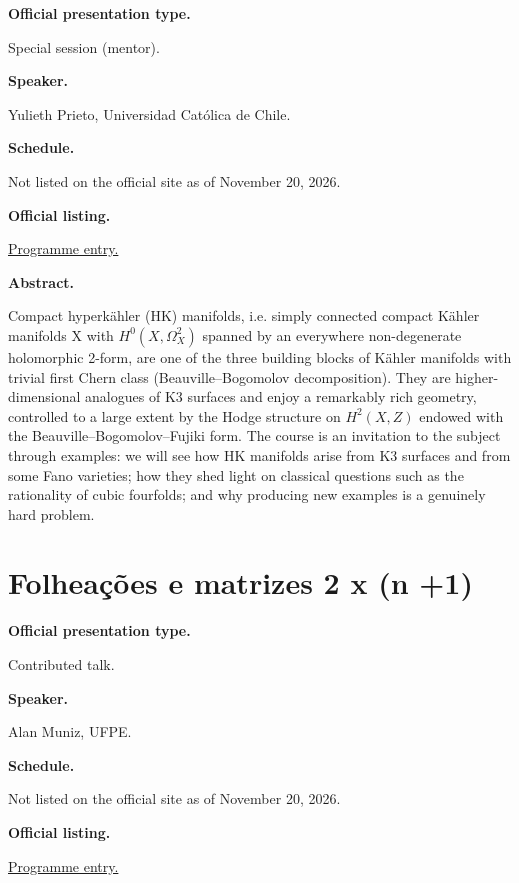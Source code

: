 \medskip\noindent
{\bf Official presentation type.}

Special session (mentor).

\medskip\noindent
{\bf Speaker.}

Yulieth Prieto, Universidad Católica de
Chile.

\medskip\noindent
{\bf Schedule.}

Not listed on the official site as of
November 20, 2026.

\medskip\noindent
{\bf Official listing.}

\href{%
https://sites.google.com/view/%
geoalgcompluff/legal/%
legal-2027-resumos#h.6f5k7zdb7c47%
}{Programme entry.}

\medskip\noindent
{\bf Abstract.}

Compact hyperkähler (HK) manifolds, i.e.
simply connected compact Kähler manifolds X
with $H^0(X,\Omega^2_X)$ spanned by an
everywhere non-degenerate holomorphic 2-form,
are one of the three building blocks of
Kähler manifolds with trivial first Chern
class (Beauville--Bogomolov decomposition).
They are higher-dimensional analogues of K3
surfaces and enjoy a remarkably rich
geometry, controlled to a large extent by the
Hodge structure on $H^2(X,Z)$ endowed with
the Beauville--Bogomolov--Fujiki form. The
course is an invitation to the subject
through examples: we will see how HK
manifolds arise from K3 surfaces and from
some Fano varieties; how they shed light on
classical questions such as the rationality
of cubic fourfolds; and why producing new
examples is a genuinely hard problem.

\section{Folheações e matrizes 2 x (n +1)}
\label{section-folheacoes-e-matrizes-2-x-n-1}

\medskip\noindent
{\bf Official presentation type.}

Contributed talk.

\medskip\noindent
{\bf Speaker.}

Alan Muniz, UFPE.

\medskip\noindent
{\bf Schedule.}

Not listed on the official site as of
November 20, 2026.

\medskip\noindent
{\bf Official listing.}

\href{%
https://sites.google.com/view/%
geoalgcompluff/legal/%
legal-2027-resumos#h.dant8g3oe5ea%
}{Programme entry.}

